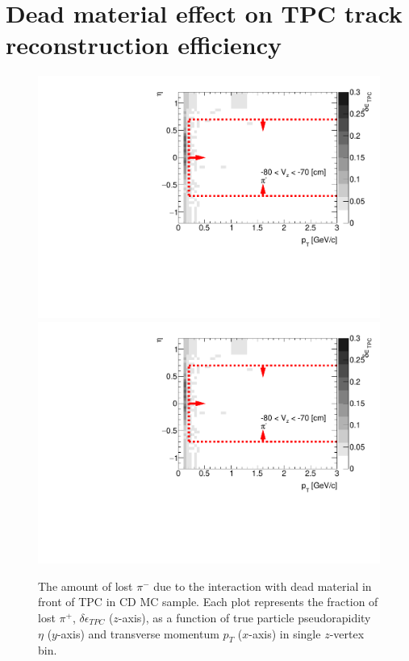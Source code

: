 
\chapter{Dead material effect on TPC track reconstruction efficiency}\label{appendix:deadMaterial}
\begin{figure}[hb]
	\caption[The amount of lost $\pi^+$ due to the interaction with dead material in front of TPC as a function of $p_T$, $\eta$ and $z$-vertex in CD]{The amount of lost $\pi^-$ due to the interaction with dead material in front of TPC in CD MC sample. Each plot represents the fraction of lost $\pi^+$, $\delta\epsilon_{ TPC}$ ($z$-axis), as a function of true particle pseudorapidity $\eta$ ($y$-axis) and transverse momentum $p_{T}$ ($x$-axis) in single $z$-vertex bin.}\label{fig:dead_materialCD3Dpip}
	\centering
	\parbox{0.325\textwidth}{
		\centering
		\includegraphics[width=\linewidth,page=49]{graphics/systematicsEfficiency/deadMaterial/secondaries_Unbinned_CD_.pdf}\\
		\includegraphics[width=\linewidth,page=52]{graphics/systematicsEfficiency/deadMaterial/secondaries_Unbinned_CD_.pdf}\\
}
\end{figure}
